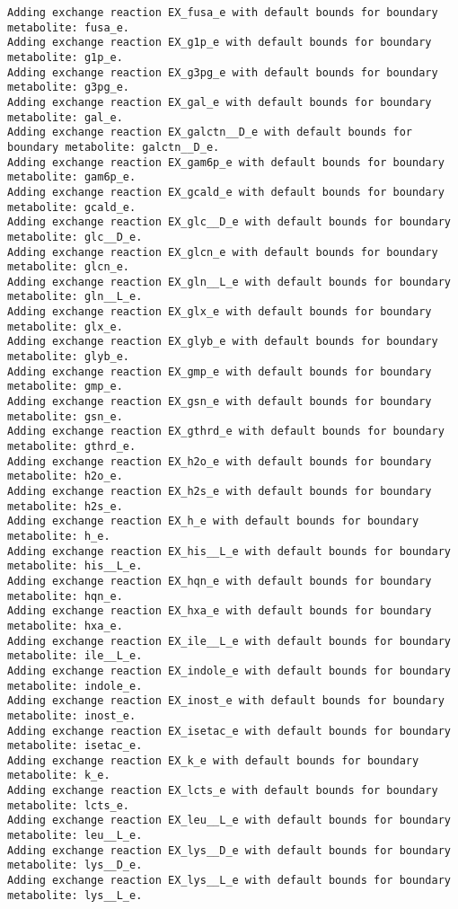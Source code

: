 \documentclass[
  letterpaper,
  DIV=11,
  numbers=noendperiod]{scrartcl}
\begin{document}
\begin{verbatim}
Adding exchange reaction EX_fusa_e with default bounds for boundary metabolite: fusa_e.
Adding exchange reaction EX_g1p_e with default bounds for boundary metabolite: g1p_e.
Adding exchange reaction EX_g3pg_e with default bounds for boundary metabolite: g3pg_e.
Adding exchange reaction EX_gal_e with default bounds for boundary metabolite: gal_e.
Adding exchange reaction EX_galctn__D_e with default bounds for boundary metabolite: galctn__D_e.
Adding exchange reaction EX_gam6p_e with default bounds for boundary metabolite: gam6p_e.
Adding exchange reaction EX_gcald_e with default bounds for boundary metabolite: gcald_e.
Adding exchange reaction EX_glc__D_e with default bounds for boundary metabolite: glc__D_e.
Adding exchange reaction EX_glcn_e with default bounds for boundary metabolite: glcn_e.
Adding exchange reaction EX_gln__L_e with default bounds for boundary metabolite: gln__L_e.
Adding exchange reaction EX_glx_e with default bounds for boundary metabolite: glx_e.
Adding exchange reaction EX_glyb_e with default bounds for boundary metabolite: glyb_e.
Adding exchange reaction EX_gmp_e with default bounds for boundary metabolite: gmp_e.
Adding exchange reaction EX_gsn_e with default bounds for boundary metabolite: gsn_e.
Adding exchange reaction EX_gthrd_e with default bounds for boundary metabolite: gthrd_e.
Adding exchange reaction EX_h2o_e with default bounds for boundary metabolite: h2o_e.
Adding exchange reaction EX_h2s_e with default bounds for boundary metabolite: h2s_e.
Adding exchange reaction EX_h_e with default bounds for boundary metabolite: h_e.
Adding exchange reaction EX_his__L_e with default bounds for boundary metabolite: his__L_e.
Adding exchange reaction EX_hqn_e with default bounds for boundary metabolite: hqn_e.
Adding exchange reaction EX_hxa_e with default bounds for boundary metabolite: hxa_e.
Adding exchange reaction EX_ile__L_e with default bounds for boundary metabolite: ile__L_e.
Adding exchange reaction EX_indole_e with default bounds for boundary metabolite: indole_e.
Adding exchange reaction EX_inost_e with default bounds for boundary metabolite: inost_e.
Adding exchange reaction EX_isetac_e with default bounds for boundary metabolite: isetac_e.
Adding exchange reaction EX_k_e with default bounds for boundary metabolite: k_e.
Adding exchange reaction EX_lcts_e with default bounds for boundary metabolite: lcts_e.
Adding exchange reaction EX_leu__L_e with default bounds for boundary metabolite: leu__L_e.
Adding exchange reaction EX_lys__D_e with default bounds for boundary metabolite: lys__D_e.
Adding exchange reaction EX_lys__L_e with default bounds for boundary metabolite: lys__L_e.

\end{verbatim}
\end{document}
